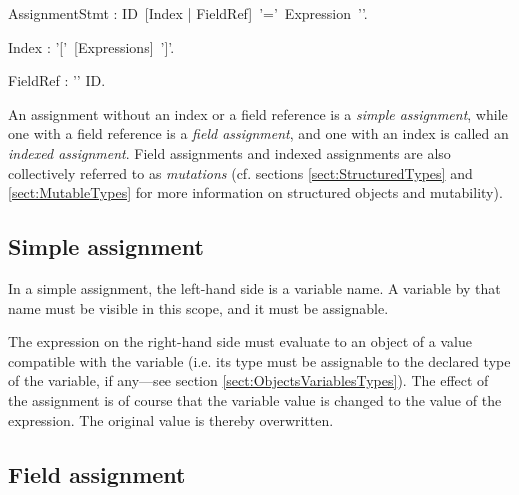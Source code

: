 \bgr
AssignmentStmt :
   ID~[Index | FieldRef]~'\charColon='~Expression~'\charSemi'.

Index : '['~[Expressions]~']'.

FieldRef : '\charDot' ID.
\egr





An assignment without an index or a field reference is a {\em simple
  assignment}, while one with a field reference is a {\em field
  assignment}, and one with an index is called an {\em indexed
  assignment}. Field assignments and indexed assignments are also
collectively referred to as {\em mutations} (cf. sections
\ref{sect:StructuredTypes} and \ref{sect:MutableTypes} for more
information on structured objects and mutability).

\subsection{Simple assignment}\label{sect:SimpleAssignment}



In a simple assignment, the left-hand side is a variable name. A
variable by that name must be visible in this scope, and it must be
assignable.

The expression on the right-hand side must evaluate to an object of a
value compatible with the variable  (i.e. its type must be assignable
to the declared type of the variable, if any---see section
\ref{sect:ObjectsVariablesTypes}). The effect of the assignment is of
course that the variable value is changed to the value of the
expression. The original value is thereby overwritten.




\subsection{Field assignment}\label{sect:FieldAssignment}

